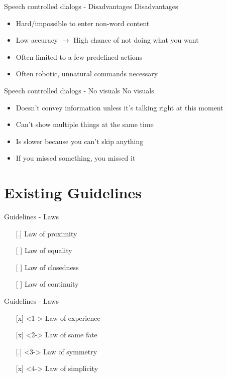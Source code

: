 \documentclass[
  10pt
, handout
]{beamer}
\begin{document}
\begin{frame}{Speech controlled dialogs - Disadvantages}
  Disadvantages

  \begin{itemize}
    \item<+-> Hard/impossible to enter non-word content
    \item<+-> Low accuracy $\rightarrow$ High chance of not doing what you want
    \item<+-> Often limited to a few predefined actions
    \item<+-> Often robotic, unnatural commands necessary
  \end{itemize}
\end{frame}

\begin{frame}{Speech controlled dialogs - No visuals}
  No visuals

  \begin{itemize}
    \item Doesn't convey information unless it's talking right at this moment
    \item Can't show multiple things at the same time
    \item Is slower because you can't skip anything
    \item If you missed something, you missed it
  \end{itemize}
\end{frame}

\section{Existing Guidelines}  %

\begin{frame}{Guidelines - Laws}
  \begin{itemize}
    \item[{[.]}] Law of proximity
    \item[{[ ]}] Law of equality
    \item[{[ ]}] Law of closedness
    \item[{[ ]}] Law of continuity
  \end{itemize}
\end{frame}

\begin{frame}{Guidelines - Laws}
  \begin{itemize}
    \item[{[x]}]<1-> Law of experience
    \item[{[x]}]<2-> Law of same fate
    \item[{[.]}]<3-> Law of symmetry
    \item[{[x]}]<4-> Law of simplicity
  \end{itemize}
\end{frame}
\end{document}
